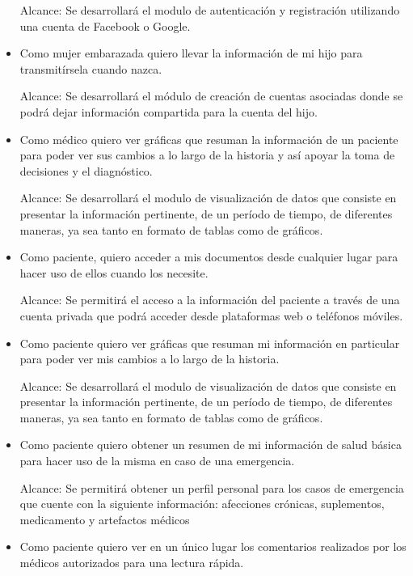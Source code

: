 \begin{itemize}
    Alcance: Se desarrollará el modulo de autenticación y registración utilizando una cuenta de Facebook o Google.
 	\item Como mujer embarazada quiero llevar la información de mi hijo para transmitírsela cuando nazca.
    
    Alcance: Se desarrollará el módulo de creación de cuentas asociadas donde se podrá dejar información compartida para la cuenta del hijo.
    
    \item Como médico quiero ver gráficas que resuman la información de un paciente para poder ver sus cambios a lo largo de la historia y así apoyar la toma de decisiones y el diagnóstico.
    
    Alcance: Se desarrollará el modulo de visualización de datos que consiste en presentar la información pertinente, de un período de tiempo, de diferentes maneras, ya sea tanto en formato de tablas como de gráficos. 
	\item Como paciente, quiero acceder a mis documentos desde cualquier lugar para hacer uso de ellos cuando los necesite.
    
    Alcance: Se permitirá el acceso a la información del paciente a través de una cuenta privada que podrá acceder desde plataformas web o teléfonos móviles. %
    
	\item Como paciente quiero ver gráficas que resuman mi información en particular para poder ver mis cambios a lo largo de la historia.
    
    Alcance: Se desarrollará el modulo de visualización de datos que consiste en presentar la información pertinente, de un período de tiempo, de diferentes maneras, ya sea tanto en formato de tablas como de gráficos. 
	\item Como paciente quiero obtener un resumen de mi información de salud básica para hacer uso de la misma en caso de una emergencia.
    
    Alcance: Se permitirá obtener un perfil personal para los casos de emergencia que cuente con la siguiente información: afecciones crónicas, suplementos, medicamento y artefactos médicos
	\item Como paciente quiero ver en un único lugar los comentarios realizados por los médicos autorizados para una lectura rápida.
    

\end{itemize}

